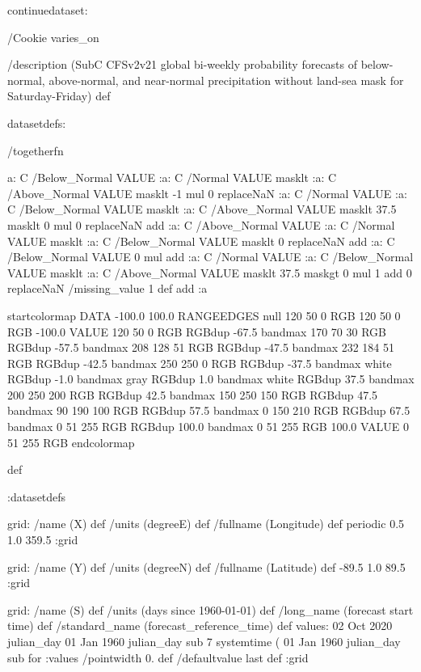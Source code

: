\begin{ingrid}

continuedataset:


/Cookie varies_on

/description (SubC CFSv2v21 global bi-weekly probability forecasts of below-normal, above-normal, and near-normal precipitation without land-sea mask for Saturday-Friday) def

datasetdefs:

/togetherfn {
 a:
    C /Below_Normal VALUE
    :a:
     C /Normal VALUE
     masklt
    :a:
     C /Above_Normal VALUE
     masklt
    -1 mul
    0 replaceNaN
    :a:
     C /Normal VALUE
     :a:
      C /Below_Normal VALUE
      masklt
     :a:
      C /Above_Normal VALUE
      masklt
     37.5 masklt
     0 mul
     0 replaceNaN           
     add
    :a:
     C /Above_Normal VALUE
     :a:
      C /Normal VALUE
      masklt
     :a:
      C /Below_Normal VALUE
      masklt
     0 replaceNaN
     add
 :a:
     C /Below_Normal VALUE
     0 mul
     add
    :a:
     C /Normal VALUE
     :a:
      C /Below_Normal VALUE
      masklt
     :a:
      C /Above_Normal VALUE        
      masklt
     37.5 maskgt
     0 mul
     1 add
     0 replaceNaN
     /missing_value 1 def
     add
    :a

startcolormap
DATA -100.0 100.0 RANGEEDGES
null 120 50 0 RGB
120 50 0 RGB -100.0 VALUE
120 50 0 RGB RGBdup -67.5 bandmax
170 70 30 RGB RGBdup -57.5 bandmax
208 128 51 RGB RGBdup -47.5 bandmax
232 184 51 RGB RGBdup -42.5 bandmax
250 250 0 RGB RGBdup -37.5 bandmax
white RGBdup -1.0 bandmax
gray RGBdup 1.0 bandmax
white RGBdup 37.5 bandmax
200 250 200 RGB RGBdup 42.5 bandmax
150 250 150 RGB RGBdup 47.5 bandmax
90 190 100 RGB RGBdup 57.5 bandmax
0 150 210 RGB RGBdup 67.5 bandmax
0 51 255 RGB RGBdup 100.0 bandmax
0 51 255 RGB 100.0 VALUE
0 51 255 RGB
endcolormap
} def 

:datasetdefs


grid:
/name (X) def
/units (degreeE) def
/fullname (Longitude) def
periodic
0.5 1.0 359.5
:grid

grid:
/name (Y) def
/units (degreeN) def
/fullname (Latitude) def
-89.5 1.0 89.5
:grid


grid:
/name (S) def
/units (days since 1960-01-01) def
/long_name (forecast start time) def
/standard_name (forecast_reference_time) def
values:
02 Oct 2020 julian_day 01 Jan 1960 julian_day sub
7
systemtime
(%
01 Jan 1960 julian_day sub
{} for
:values
/pointwidth 0. def
/defaultvalue { last } def
:grid


\end{ingrid}
